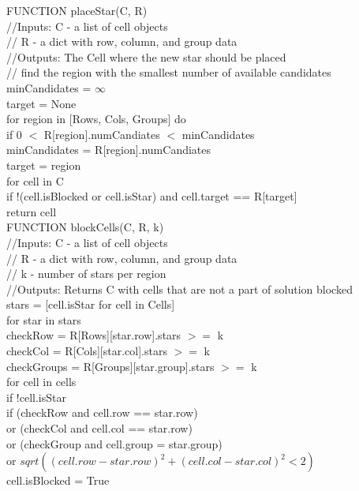 \documentclass{article}
\newcommand\tab[1][0.5cm]{\hspace*{#1}}
\begin{document}
FUNCTION placeStar(C, R) \\
//Inputs: C - a list of cell objects \\
//  R - a dict with row, column, and group data \\
//Outputs: The Cell where the new star should be placed \\
// find the region with the smallest number of available candidates \\
minCandidates = $\infty$ \\
target = None \\
for region in [Rows, Cols, Groups] do \\
\tab if 0 $<$ R[region].numCandiates $<$ minCandidates \\
\tab\tab minCandidates = R[region].numCandiates \\
\tab\tab target = region \\
for cell in C \\
\tab if !(cell.isBlocked or cell.isStar) and cell.target == R[target]\\
\tab\tab return cell \\

FUNCTION blockCells(C, R, k) \\
//Inputs: C - a list of cell objects \\
//  R - a dict with row, column, and group data \\
//  k - number of stars per region \\
//Outputs: Returns C with cells that are not a part of solution blocked \\
stars = [cell.isStar for cell in Cells] \\
for star in stars \\
\tab checkRow = R[Rows][star.row].stars $>=$ k \\
\tab checkCol = R[Cols][star.col].stars $>=$ k \\
\tab checkGroups = R[Groups][star.group].stars $>=$ k \\
\tab for cell in cells \\
\tab\tab if !cell.isStar \\
\tab\tab\tab if (checkRow and cell.row == star.row) \\
\tab\tab\tab\tab\tab or (checkCol and cell.col == star.row) \\
\tab\tab\tab\tab\tab or (checkGroup and cell.group = star.group) \\
\tab\tab\tab\tab\tab or $sqrt((cell.row - star.row)^2 + (cell.col - star.col)^2
    < 2)$ \\
\tab\tab\tab\tab cell.isBlocked = True
\end{document}
